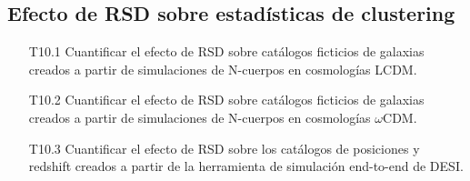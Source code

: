 \subsection*{Efecto de RSD sobre estad\'isticas de clustering}
\begin{itemize}
\item[T10.1] \gradB
  Cuantificar el efecto de RSD sobre cat\'alogos ficticios de
  galaxias creados a partir de simulaciones de N-cuerpos en
  cosmolog\'ias LCDM. 
\item[T10.2] \gradB Cuantificar el efecto de RSD sobre cat\'alogos ficticios de
  galaxias creados a partir de simulaciones de N-cuerpos en
  cosmolog\'ias $\omega$CDM. 
\item[T10.3] \gradB Cuantificar el efecto de RSD sobre los cat\'alogos de
  posiciones y redshift creados a partir de la herramienta de
  simulaci\'on end-to-end de DESI. 
\end{itemize}


